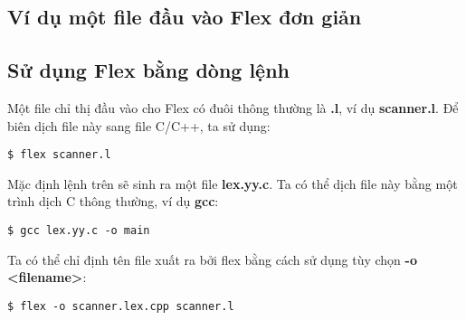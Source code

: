 \documentclass[../report.tex]{subfiles}
\begin{document}
\subsection{Ví dụ một file đầu vào Flex đơn giản} 

\subsection{Sử dụng Flex bằng dòng lệnh} 
Một file chỉ thị đầu vào cho Flex có đuôi thông thường là \textbf{.l}, ví dụ \textbf{scanner.l}. 
Để biên dịch file này sang file C/C++, ta sử dụng:
\begin{verbatim}
$ flex scanner.l
\end{verbatim}
Mặc định lệnh trên sẽ sinh ra một file \textbf{lex.yy.c}.
Ta có thể dịch file này bằng một trình dịch C thông thường, ví dụ \textbf{gcc}:
\begin{verbatim}
$ gcc lex.yy.c -o main
\end{verbatim}
Ta có thể chỉ định tên file xuất ra bởi flex bằng cách sử dụng tùy chọn \textbf{-o <filename>}:
\begin{verbatim}
$ flex -o scanner.lex.cpp scanner.l
\end{verbatim}
\end{document}
